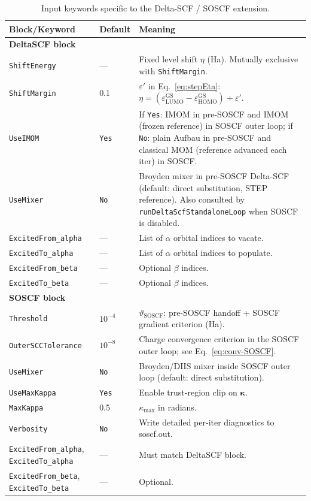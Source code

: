 \documentclass[11pt,a4paper]{article}
\newcommand{\kkappa}{\bm{\kappa}}
\begin{document}
\begin{table}[h]
\centering
\begin{tabular}{lll}
\toprule
Block/Keyword & Default & Meaning \\
\midrule
\multicolumn{3}{l}{\textbf{DeltaSCF block}} \\
\texttt{ShiftEnergy} & --- & Fixed level shift $\eta$ (Ha). Mutually exclusive with \texttt{ShiftMargin}. \\
\texttt{ShiftMargin} & 0.1 & $\varepsilon'$ in Eq.~\eqref{eq:stepEta}: $\eta = (\varepsilon_\mathrm{LUMO}^\mathrm{GS}-\varepsilon_\mathrm{HOMO}^\mathrm{GS})+\varepsilon'$. \\
\texttt{UseIMOM} & \texttt{Yes} & If \texttt{Yes}: IMOM in pre-SOSCF and IMOM (frozen reference) in SOSCF outer loop; if \texttt{No}: plain Aufbau in pre-SOSCF and classical MOM (reference advanced each iter) in SOSCF. \\
\texttt{UseMixer} & \texttt{No} & Broyden mixer in pre-SOSCF Delta-SCF (default: direct substitution, STEP reference). Also consulted by \texttt{runDeltaScfStandaloneLoop} when SOSCF is disabled. \\
\texttt{ExcitedFrom\_alpha} & --- & List of $\alpha$ orbital indices to vacate. \\
\texttt{ExcitedTo\_alpha}   & --- & List of $\alpha$ orbital indices to populate. \\
\texttt{ExcitedFrom\_beta}  & --- & Optional $\beta$ indices. \\
\texttt{ExcitedTo\_beta}    & --- & Optional $\beta$ indices. \\
\midrule
\multicolumn{3}{l}{\textbf{SOSCF block}} \\
\texttt{Threshold}          & $10^{-4}$ & $\vartheta_\mathrm{SOSCF}$: pre-SOSCF handoff + SOSCF gradient criterion (Ha). \\
\texttt{OuterSCCTolerance}  & $10^{-8}$  & Charge convergence criterion in the SOSCF outer loop; see Eq.~\eqref{eq:conv-SOSCF}. \\
\texttt{UseMixer}           & \texttt{No}  & Broyden/DIIS mixer inside SOSCF outer loop (default: direct substitution). \\
\texttt{UseMaxKappa}        & \texttt{Yes} & Enable trust-region clip on $\kkappa$. \\
\texttt{MaxKappa}           & 0.5 & $\kappa_\mathrm{max}$ in radians. \\
\texttt{Verbosity}          & \texttt{No} & Write detailed per-iter diagnostics to soscf.out. \\
\texttt{ExcitedFrom\_alpha}, \texttt{ExcitedTo\_alpha} & --- & Must match DeltaSCF block. \\
\texttt{ExcitedFrom\_beta}, \texttt{ExcitedTo\_beta} & --- & Optional. \\
\bottomrule
\end{tabular}
\caption{Input keywords specific to the Delta-SCF / SOSCF extension.}
\end{table}
\end{document}
